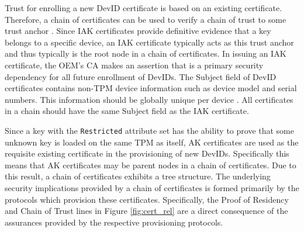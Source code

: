 Trust for enrolling a new DevID certificate is based on an existing certificate. Therefore, a chain of certificates can be used to verify a chain of trust to some trust anchor \cite{DevIDSpec-TCG}. Since IAK certificates provide definitive evidence that a key belongs to a specific device, an IAK certificate typically acts as this trust anchor and thus typically is the root node in a chain of certificates. In issuing an IAK certificate, the OEM's CA makes an assertion that is a primary security dependency for all future enrollment of DevIDs. 
The Subject field of DevID certificates contains non-TPM device information such as device model and serial numbers. This information should be globally unique per device \cite{DevIDSpec-IEEE}. All certificates in a chain should have the same Subject field as the IAK certificate.





Since a key with the \verb|Restricted| attribute set has the ability to prove that some unknown key is loaded on the same TPM as itself, AK certificates are used as the requisite existing certificate in the provisioning of new DevIDs. Specifically this means that AK certificates may be parent nodes in a chain of certificates. Due to this result, a chain of certificates exhibits a tree structure.
The underlying security implications provided by a chain of certificates is formed primarily by the protocols which provision these certificates. Specifically, the Proof of Residency and Chain of Trust lines in Figure \ref{fig:cert_rel} are a direct consequence of the assurances provided by the respective provisioning protocols.



